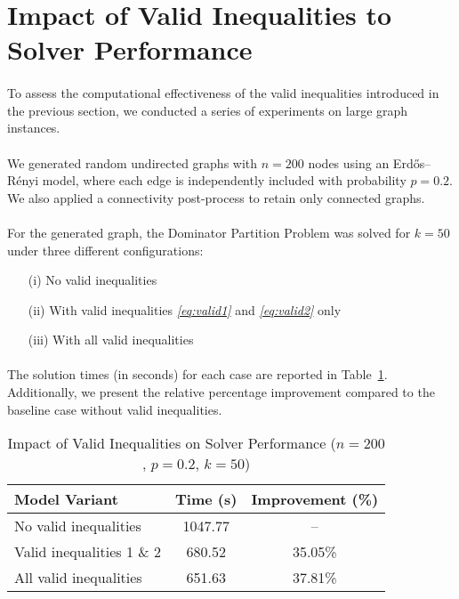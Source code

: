 \section{Impact of Valid Inequalities to Solver Performance}
\label{sec:impact_of_valid_inequalities}


\paragraph{} To assess the computational effectiveness of the valid inequalities introduced in the previous section, we conducted a series of experiments on large graph instances.

\paragraph{} We generated random undirected graphs with $n = 200$ nodes using an Erdős–Rényi model, where each edge is independently included with probability $p = 0.2$. We also applied a connectivity post-process to retain only connected graphs.

\paragraph{} For the generated graph, the Dominator Partition Problem was solved for $k = 50$ under three different configurations:
\begin{itemize}
    \item[(i)] No valid inequalities
    \item[(ii)] With valid inequalities \textsl{\autoref{eq:valid1}} and \textsl{\autoref{eq:valid2}} only
    \item[(iii)] With all valid inequalities
\end{itemize}

\paragraph{} The solution times (in seconds) for each case are reported in Table~\ref{tab:performance}. Additionally, we present the relative percentage improvement compared to the baseline case without valid inequalities.

\begin{table}[H]
\centering
\caption{Impact of Valid Inequalities on Solver Performance ($n=200$, $p=0.2$, $k=50$)}
\label{tab:performance}
\begin{tabular}{l|c|c}
\textbf{Model Variant} & \textbf{Time (s)} & \textbf{Improvement (\%)} \\
\hline
No valid inequalities        & 1047.77 & -- \\
Valid inequalities 1 \& 2    & 680.52  & 35.05\% \\
All valid inequalities       & 651.63  & 37.81\% \\
\end{tabular}
\end{table}

